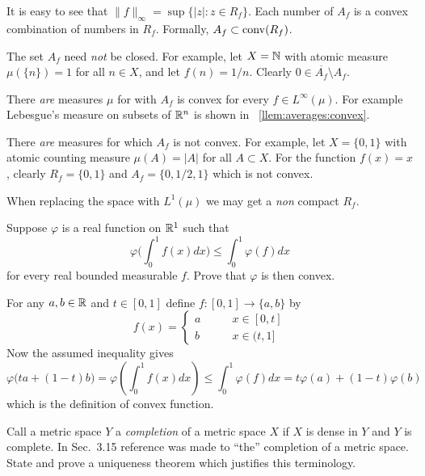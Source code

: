 \begin{enumerate}
It is easy to see that  \(\|f\|_\infty = \sup\{|z|: z\in R_f\}\).
Each number of \(A_f\) is a convex combination of numbers in \(R_f\).
Formally, \(A_f \subset \mathop{\rm conv}\nolimits(R_f)\).

The set \(A_f\) need \emph{not} be closed. For example, let \(X=\mathbb{N}\)
with atomic measure \(\mu(\{n\}) = 1\) for all \(n\in X\),
and let \(f(n) = 1/n\). Clearly \(0\in \overline{A_f}\setminus A_f\).

There \emph{are} measures \(\mu\) for with \(A_f\) is convex
for every \(f\in L^\infty(\mu)\).
For example Lebesgue's measure on subsets of \(\mathbb{R}^n\) is shown
in \loclemma~\ref{llem:averages:convex}.

There \emph{are} measures for which \(A_f\) is not convex.
For example, let \(X=\{0,1\}\) with atomic counting measure \(\mu(A)=|A|\)
for all \(A\subset X\). For the function \(f(x) = x\), clearly
\(R_f=\{0,1\}\) and \(A_f=\{0,1/2,1\}\) which is not convex.

When replacing the space with \(L^1(\mu)\) we may get
a \emph{non} compact \(R_f\).


\begin{excopy}
Suppose \(\varphi\) is a real function on \(\mathbb{R}^1\) such that
\begin{equation*}
 \varphi\bigl(\int_0^1 f(x)dx\bigr) \leq \int_0^1  \varphi(f)dx
\end{equation*}
for every real bounded measurable $f$. Prove that \(\varphi\) is then convex.
\end{excopy}

For any \(a,b\in\mathbb{R}\) and \(t\in [0,1]\)
define \(f:[0,1] \to \{a,b\}\) by
\begin{equation*}
 f(x) = \left\{\begin{array}{ll}
               a & \qquad x \in [0,t] \\
               b & \qquad x \in (t,1]
               \end{array}\right.
\end{equation*}
Now the assumed inequality gives
\begin{equation*}
  \varphi\bigl( ta + (1-t)b\bigr)
 =
  \varphi\left(\int_0^1 f(x)dx\right)
 \leq
  \int_0^1  \varphi(f)dx
 =
  t \varphi(a) + (1-t)\varphi(b)
\end{equation*}
which is the definition of convex function.



\begin{excopy}
Call a metric space $Y$ a \emph{completion} of a metric space $X$ if $X$ is
dense in $Y$ and $Y$ is complete.
In Sec.~3.15 reference was made to ``the'' completion of a metric space.
State and prove a uniqueness theorem which justifies this terminology.
\end{excopy}


\end{enumerate}
